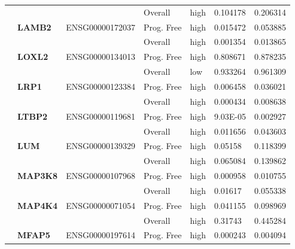 \begin{spacing}{1}
{\begin{longtable}{|>{\bfseries}p{2cm}|>{\bfseries}p{1.9cm}|p{2.8cm}|p{2cm}|p{2cm}|p{1.5cm}|p{1.5cm}|}
            \hhline{~~~----}
             &          &                 & Overall    & high & 0.104178 & 0.206314 \\
            \hhline{~======}
             & LAMB2    & ENSG00000172037 & Prog. Free & high & 0.015472 & 0.053885 \\
            \hhline{~~~----}
             &          &                 & Overall    & high & 0.001354 & 0.013865 \\
            \hhline{~======}
             & LOXL2    & ENSG00000134013 & Prog. Free & high & 0.808671 & 0.878235 \\
            \hhline{~~~----}
             &          &                 & Overall    & low  & 0.933264 & 0.961309 \\
            \hhline{~======}
             & LRP1     & ENSG00000123384 & Prog. Free & high & 0.006458 & 0.036021 \\
            \hhline{~~~----}
             &          &                 & Overall    & high & 0.000434 & 0.008638 \\
            \hhline{~======}
             & LTBP2    & ENSG00000119681 & Prog. Free & high & 9.03E-05 & 0.002927 \\
            \hhline{~~~----}
             &          &                 & Overall    & high & 0.011656 & 0.043603 \\
            \hhline{~======}
             & LUM      & ENSG00000139329 & Prog. Free & high & 0.05158  & 0.118399 \\
            \hhline{~~~----}
             &          &                 & Overall    & high & 0.065084 & 0.139862 \\
            \hhline{~======}
            \multirow{2}{3cm}{True}
             & MAP3K8   & ENSG00000107968 & Prog. Free & high & 0.000958 & 0.010755 \\
            \hhline{~~~----}
             &          &                 & Overall    & high & 0.01617  & 0.055338 \\
            \hhline{~======}
             & MAP4K4   & ENSG00000071054 & Prog. Free & high & 0.041155 & 0.098969 \\
            \hhline{~~~----}
             &          &                 & Overall    & high & 0.31743  & 0.445284 \\
            \hhline{~======}
             & MFAP5    & ENSG00000197614 & Prog. Free & high & 0.000243 & 0.004094 \\

\end{longtable}}
\end{spacing}
